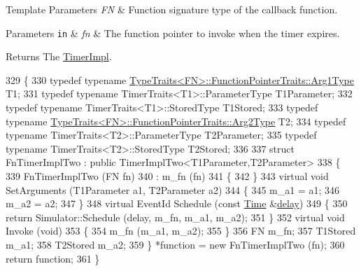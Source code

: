 \begin{DoxyTemplParams}{Template Parameters}
{\em FN} & Function signature type of the callback function. \\
\hline
\end{DoxyTemplParams}

\begin{DoxyParams}[1]{Parameters}
\mbox{\tt in}  & {\em fn} & The function pointer to invoke when the timer expires. \\
\hline
\end{DoxyParams}
\begin{DoxyReturn}{Returns}
The \hyperlink{classns3_1_1TimerImpl}{Timer\+Impl}. 
\end{DoxyReturn}

\begin{DoxyCode}
329 \{
330   \textcolor{keyword}{typedef} \textcolor{keyword}{typename} \hyperlink{structTypeTraits}{TypeTraits<FN>::FunctionPointerTraits::Arg1Type}
       T1;
331   \textcolor{keyword}{typedef} \textcolor{keyword}{typename} TimerTraits<T1>::ParameterType T1Parameter;
332   \textcolor{keyword}{typedef} \textcolor{keyword}{typename} TimerTraits<T1>::StoredType T1Stored;
333   \textcolor{keyword}{typedef} \textcolor{keyword}{typename} \hyperlink{structTypeTraits}{TypeTraits<FN>::FunctionPointerTraits::Arg2Type}
       T2;
334   \textcolor{keyword}{typedef} \textcolor{keyword}{typename} TimerTraits<T2>::ParameterType T2Parameter;
335   \textcolor{keyword}{typedef} \textcolor{keyword}{typename} TimerTraits<T2>::StoredType T2Stored;
336 
337   \textcolor{keyword}{struct }FnTimerImplTwo : \textcolor{keyword}{public} TimerImplTwo<T1Parameter,T2Parameter>
338   \{
339     FnTimerImplTwo (FN fn)
340       : m\_fn (fn)
341     \{
342     \}
343     \textcolor{keyword}{virtual} \textcolor{keywordtype}{void} SetArguments (T1Parameter a1, T2Parameter a2)
344     \{
345       m\_a1 = a1;
346       m\_a2 = a2;
347     \}
348     \textcolor{keyword}{virtual} EventId Schedule (\textcolor{keyword}{const} \hyperlink{namespacens3_1_1TracedValueCallback_a7ffd3e7c142ffe7c8a1d2db9b8de38ec}{Time} &\hyperlink{lte_2model_2fading-traces_2fading__trace__generator_8m_a7964e6aa8f61a9d28973c8267a606ad8}{delay})
349     \{
350       \textcolor{keywordflow}{return} Simulator::Schedule (delay, m\_fn, m\_a1, m\_a2);
351     \}
352     \textcolor{keyword}{virtual} \textcolor{keywordtype}{void} Invoke (\textcolor{keywordtype}{void})
353     \{
354       m\_fn (m\_a1, m\_a2);
355     \}
356     FN m\_fn;
357     T1Stored m\_a1;
358     T2Stored m\_a2;
359   \} *\textcolor{keyword}{function} = \textcolor{keyword}{new} FnTimerImplTwo (fn);
360   \textcolor{keywordflow}{return} \textcolor{keyword}{function};
361 \}
\end{DoxyCode}


